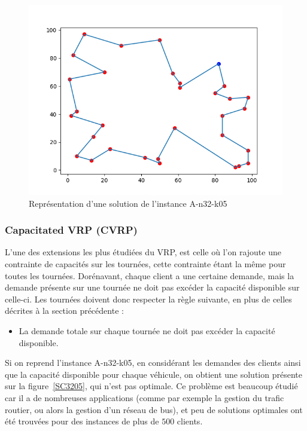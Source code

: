 \documentclass[a4paper,11pt]{article}%
\begin{document}
\begin{figure}

\centering
\includegraphics[scale=0.5]{solutionNoCapacity.png}
\caption{Représentation d'une solution de l'instance A-n32-k05}
\label{SNC3205}
\end{figure}

\subsubsection{Capacitated VRP (CVRP)}

L'une des extensions les plus étudiées du VRP, est celle où l'on rajoute une contrainte de capacités sur les tournées, cette contrainte étant la même pour toutes les tournées. 
Dorénavant, chaque client a une certaine demande, mais la demande présente sur une tournée ne doit pas excéder la capacité disponible sur celle-ci.
Les tournées doivent donc respecter la règle suivante, en plus de celles décrites à la section précédente :
\begin{itemize}
\item La demande totale sur chaque tournée ne doit pas excéder la capacité disponible.
\end{itemize}
Si on reprend l'instance A-n32-k05, en considérant les demandes des clients ainsi que la capacité disponible pour chaque véhicule, on obtient une solution présente sur la figure~\ref{SC3205}, qui n'est pas optimale. 
Ce problème est beaucoup étudié car il a de nombreuses applications (comme par exemple la gestion du trafic routier, ou alors la gestion d'un réseau de bus), et peu de solutions optimales ont été trouvées pour des instances de plus de $500$ clients. 
\end{document}
